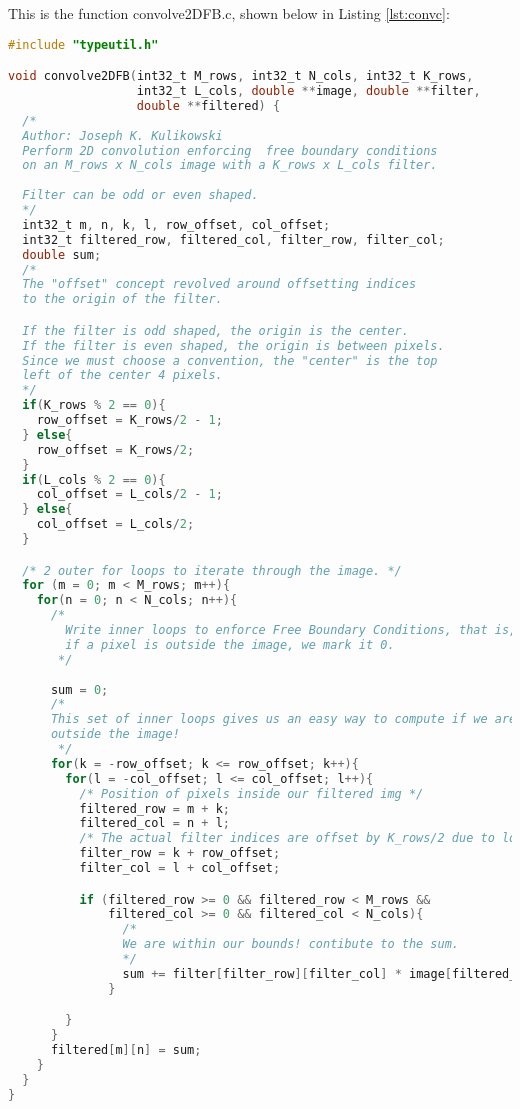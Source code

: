 \documentclass{article}
\begin{document}
This is the function convolve2DFB.c, shown below in Listing \ref{lst:convc}:
\begin{lstlisting}[language=C, caption=conv2DFB.c, label={lst:convc}]
#include "typeutil.h"

void convolve2DFB(int32_t M_rows, int32_t N_cols, int32_t K_rows, 
                  int32_t L_cols, double **image, double **filter,
                  double **filtered) {
  /*
  Author: Joseph K. Kulikowski
  Perform 2D convolution enforcing  free boundary conditions
  on an M_rows x N_cols image with a K_rows x L_cols filter.
  
  Filter can be odd or even shaped.
  */
  int32_t m, n, k, l, row_offset, col_offset;
  int32_t filtered_row, filtered_col, filter_row, filter_col;
  double sum;
  /*
  The "offset" concept revolved around offsetting indices
  to the origin of the filter.

  If the filter is odd shaped, the origin is the center.
  If the filter is even shaped, the origin is between pixels.
  Since we must choose a convention, the "center" is the top
  left of the center 4 pixels.
  */
  if(K_rows % 2 == 0){
    row_offset = K_rows/2 - 1;
  } else{
    row_offset = K_rows/2;
  }
  if(L_cols % 2 == 0){
    col_offset = L_cols/2 - 1;
  } else{
    col_offset = L_cols/2;
  }

  /* 2 outer for loops to iterate through the image. */
  for (m = 0; m < M_rows; m++){
    for(n = 0; n < N_cols; n++){
      /* 
        Write inner loops to enforce Free Boundary Conditions, that is,
        if a pixel is outside the image, we mark it 0.
       */
      
      sum = 0;
      /* 
      This set of inner loops gives us an easy way to compute if we are
      outside the image!   
       */
      for(k = -row_offset; k <= row_offset; k++){
        for(l = -col_offset; l <= col_offset; l++){
          /* Position of pixels inside our filtered img */
          filtered_row = m + k;
          filtered_col = n + l;
          /* The actual filter indices are offset by K_rows/2 due to loop vars. */
          filter_row = k + row_offset;
          filter_col = l + col_offset;

          if (filtered_row >= 0 && filtered_row < M_rows &&
              filtered_col >= 0 && filtered_col < N_cols){
                /*
                We are within our bounds! contibute to the sum.
                */ 
                sum += filter[filter_row][filter_col] * image[filtered_row][filtered_col];
              }

        }
      }
      filtered[m][n] = sum;
    }
  }
}
\end{lstlisting}
\end{document}
